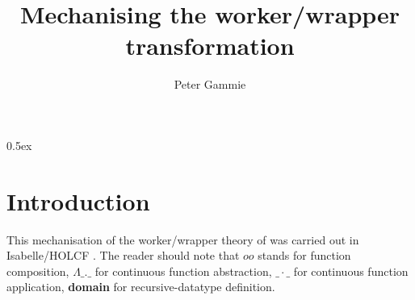 \documentclass[11pt,a4paper]{article}
\begin{document}
\title{Mechanising the worker/wrapper transformation}
\author{Peter Gammie}
\maketitle

\tableofcontents

\parindent 0pt\parskip 0.5ex

\section{Introduction}

This mechanisation of the worker/wrapper theory of
\citet{GillHutton:2009} was carried out in Isabelle/HOLCF
\citep{HOLCF:1999}. The reader should note that $oo$ stands for
function composition, $\Lambda \_ . \_$ for continuous function
abstraction, $\_\cdot\_$ for continuous function application,
\textbf{domain} for recursive-datatype definition.





\end{document}
